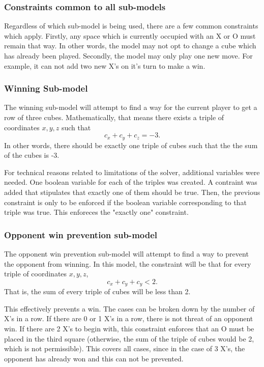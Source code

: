 \documentclass[11pt]{article}
\begin{document}
\subsubsection{Constraints common to all sub-models}
Regardless of which sub-model is being used, there are a few common constraints which apply. Firstly, any space which is currently occupied with an X or O must remain that way. In other words, the model may not opt to change a cube which has already been played. Secondly, the model may only play one new move. For example, it can not add two new X's on it's turn to make a win.

\subsubsection{Winning Sub-model}
The winning sub-model will attempt to find a way for the current player to get a row of three cubes. Mathematically, that means there exists a triple of coordinates $x, y, z$ such that
$$ c_x + c_y + c_z = -3.$$
In other words, there should be exactly one triple of cubes such that the the sum of the cubes is -3.

For technical reasons related to limitations of the solver, additional variables were needed. One boolean variable for each of the triples was created. A contraint was added that stipulates that exactly one of them should be true. Then, the previous constraint is only to be enforced if the boolean variable corresponding to that triple was true. This enforeces the "exactly one" constraint.

\subsubsection{Opponent win prevention sub-model}
The opponent win prevention sub-model will attempt to find a way to prevent the opponent from winning. In this model, the constraint will be that for every triple of coordinates $x, y,z$, $$c_x + c_y + c_y < 2.$$ That is, the sum of every triple of cubes will be less than 2.

This effectively prevents a win. The cases can be broken down by the number of X's in a row. If there are 0 or 1 X's in a row, there is not threat of an opponent win. If there are 2 X's to begin with, this constraint enforces that an O must be placed in the third square (otherwise, the sum of the triple of cubes would be 2, which is not permissible). This covers all cases, since in the case of 3 X's, the opponent has already won and this can not be prevented. 
\end{document}
